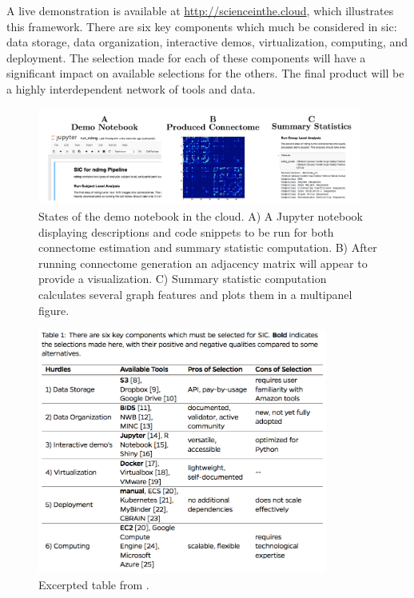 \documentclass[simplex.tex]{subfiles}
\begin{document}
A live demonstration is available at \href{http://scienceinthe.cloud}{http://scienceinthe.cloud}, which illustrates
this framework. There are six key components which much be considered in sic: data storage, data organization,
interactive demos, virtualization, computing, and deployment. The selection made for each of these components
will have a significant impact on available selections for the others. The final product will be a highly
interdependent network of tools and data.

\begin{figure}[h!]
\begin{cframed}
\centering
\includegraphics[width=0.95\textwidth]{./figs/sic.png}
\caption{
  States of the demo notebook in the cloud. A) A Jupyter notebook
  displaying descriptions and code snippets to be run for both
  connectome estimation and summary statistic computation. B) After
  running connectome generation an adjacency matrix will appear to
  provide a visualization. C) Summary statistic computation calculates
  several graph features and plots them in a multipanel figure. 
}
\label{fig:sic}
\end{cframed}
\end{figure}

\begin{figure}[h!]
\begin{cframed}
\centering
\includegraphics[width=0.85\textwidth]{./figs/sicTab.png}
\caption{
  Excerpted table from \cite{kiar2016}.
}
\label{fig:sicTab}
\end{cframed}
\end{figure}
\end{document}
